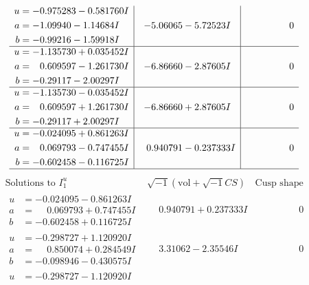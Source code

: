 \documentclass[1p]{elsarticle_modified}
\theoremstyle{definition}
\newcommand{\I}{\sqrt{-1}}
\begin{document}
$$\begin{array}{c|c|c}
\begin{aligned}
u &= -0.975283 - 0.581760 I \\
a &= -1.09940 - 1.14684 I \\
b &= -0.99216 - 1.59918 I\end{aligned}
 & -5.06065 - 5.72523 I & \phantom{-0.000000 } 0 \\ \hline\begin{aligned}
u &= -1.135730 + 0.035452 I \\
a &= \phantom{-}0.609597 - 1.261730 I \\
b &= -0.29117 - 2.00297 I\end{aligned}
 & -6.86660 - 2.87605 I & \phantom{-0.000000 } 0 \\ \hline\begin{aligned}
u &= -1.135730 - 0.035452 I \\
a &= \phantom{-}0.609597 + 1.261730 I \\
b &= -0.29117 + 2.00297 I\end{aligned}
 & -6.86660 + 2.87605 I & \phantom{-0.000000 } 0 \\ \hline\begin{aligned}
u &= -0.024095 + 0.861263 I \\
a &= \phantom{-}0.069793 - 0.747455 I \\
b &= -0.602458 - 0.116725 I\end{aligned}
 & \phantom{-}0.940791 - 0.237333 I & \phantom{-0.000000 } 0\\
 \hline 
 \end{array}$$\newpage$$\begin{array}{c|c|c}  
\text{Solutions to }I^u_{1}& \I (\text{vol} + \sqrt{-1}CS) & \text{Cusp shape}\\
 \hline 
\begin{aligned}
u &= -0.024095 - 0.861263 I \\
a &= \phantom{-}0.069793 + 0.747455 I \\
b &= -0.602458 + 0.116725 I\end{aligned}
 & \phantom{-}0.940791 + 0.237333 I & \phantom{-0.000000 } 0 \\ \hline\begin{aligned}
u &= -0.298727 + 1.120920 I \\
a &= \phantom{-}0.850074 + 0.284549 I \\
b &= -0.098946 - 0.430575 I\end{aligned}
 & \phantom{-}3.31062 - 2.35546 I & \phantom{-0.000000 } 0 \\ \hline\begin{aligned}
u &= -0.298727 - 1.120920 I \\

\end{aligned}
\end{array}$$
\end{document}
